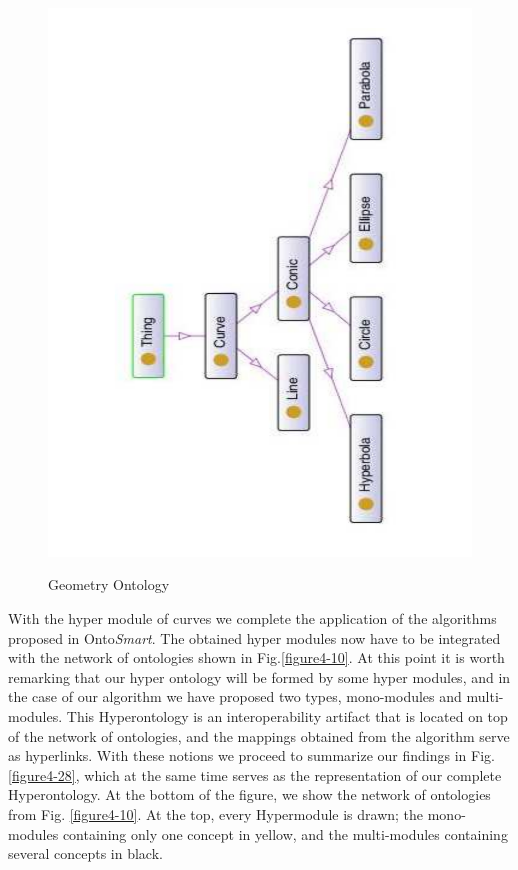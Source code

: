 \begin{figure}
\begin{minipage}{.5\textwidth}
		\includegraphics[scale=0.35, angle=270]{figure-chapterIV/fig4-27}\\
		\caption{Geometry Ontology}
		\label{figure4-27}
	\end{minipage}%
\end{figure}



With the hyper module of curves we complete the application of the algorithms proposed in Onto\textit{Smart}. The obtained hyper modules now have to be integrated with the network of ontologies shown in Fig.\ref{figure4-10}. At this point it is worth remarking that our hyper ontology will be formed by some hyper modules, and in the case of our algorithm we have proposed two types, mono-modules and multi-modules. This Hyperontology is an interoperability artifact that is located on top of the network of ontologies, and the mappings obtained from the algorithm serve as hyperlinks. With these notions we proceed to summarize our findings in Fig. \ref{figure4-28}, which at the same time serves as the representation of our complete Hyperontology. At the bottom of the figure, we show the network of ontologies from Fig. \ref{figure4-10}. At the top, every Hypermodule is drawn; the mono-modules containing only one concept in yellow, and the multi-modules containing several concepts in black. 


